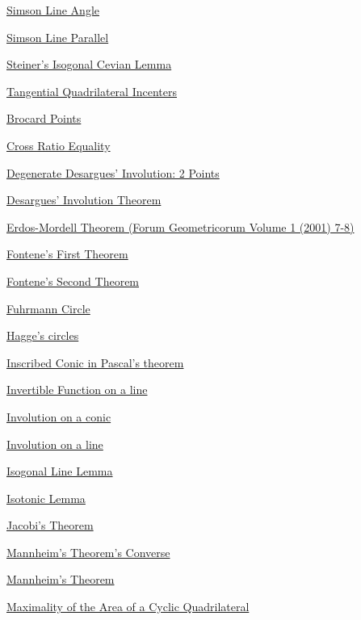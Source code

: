 \hyperref  [lemma:Simson Line Angle]{Simson Line Angle}

\hyperref  [lemma:Simson Line Parallel]{Simson Line Parallel}

\hyperref  [lemma:Steiner's Isogonal Cevian Lemma]{Steiner's Isogonal Cevian Lemma}

\hyperref  [lemma:Tangential Quadrilateral Incenters]{Tangential Quadrilateral Incenters}

\hyperref  [theorem:]{}

\hyperref  [theorem:Brocard Points]{Brocard Points}

\hyperref  [theorem:Cross Ratio Equality]{Cross Ratio Equality}

\hyperref  [theorem:Degenerate Desargues' Involution: 2 Points]{Degenerate Desargues' Involution: 2 Points}

\hyperref  [theorem:Desargues' Involution Theorem]{Desargues' Involution Theorem}

\hyperref  [theorem:Erdos-Mordell Theorem (Forum Geometricorum Volume 1 (2001) 7-8)]{Erdos-Mordell Theorem (Forum Geometricorum Volume 1 (2001) 7-8)}

\hyperref  [theorem:Fontene's First Theorem]{Fontene's First Theorem}

\hyperref  [theorem:Fontene's Second Theorem]{Fontene's Second Theorem}

\hyperref  [theorem:Fuhrmann Circle]{Fuhrmann Circle}

\hyperref  [theorem:Hagge's circles]{Hagge's circles}

\hyperref  [theorem:Inscribed Conic in Pascal's theorem]{Inscribed Conic in Pascal's theorem}

\hyperref  [theorem:Invertible Function on a line]{Invertible Function on a line}

\hyperref  [theorem:Involution on a conic]{Involution on a conic}

\hyperref  [theorem:Involution on a line]{Involution on a line}

\hyperref  [theorem:Isogonal Line Lemma]{Isogonal Line Lemma}

\hyperref  [theorem:Isotonic Lemma]{Isotonic Lemma}

\hyperref  [theorem:Jacobi's Theorem]{Jacobi's Theorem}

\hyperref  [theorem:Mannheim's Theorem's Converse]{Mannheim's Theorem's Converse}

\hyperref  [theorem:Mannheim's Theorem]{Mannheim's Theorem}

\hyperref  [theorem:Maximality of the Area of a Cyclic Quadrilateral]{Maximality of the Area of a Cyclic Quadrilateral}

